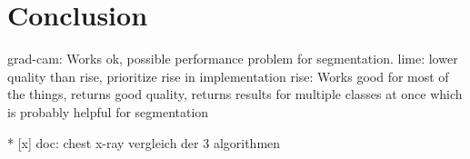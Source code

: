 \section{Conclusion}
grad-cam: Works ok, possible performance problem for segmentation.
lime: lower quality than rise, prioritize rise in implementation
rise: Works good for most of the things, returns good quality, returns results for multiple classes at once which is probably helpful for segmentation

* [x] doc: chest x-ray vergleich der 3 algorithmen